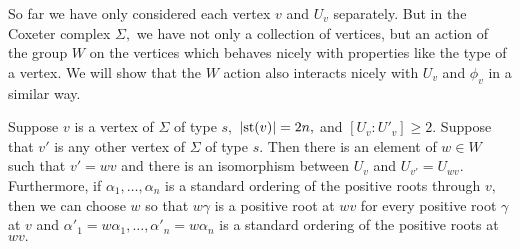 \documentclass[class=book, crop=false,12 pt]{standalone}
\begin{document}
So far we have only considered each vertex $v$ and $U_v$ separately. But in the Coxeter complex $\Sigma,$ we have not only a collection of vertices, but an action of the group $W$ on the vertices which behaves nicely with properties like the type of a vertex. We will show that the $W$ action also interacts nicely with $U_v$ and $\phi_v$ in a similar way.

\begin{lemma}
	\label{lem:resporder}
	Suppose $v$ is a vertex of $\Sigma$ of type $s,$ $|\mathrm{st}(v)|=2n,$ and $[U_v:U'_v]\ge 2.$ Suppose that $v'$ is any other vertex of $\Sigma$ of type $s.$ Then there is an element of $w\in W$ such that $v'=wv$ and there is an isomorphism between $U_v$ and $U_{v'}=U_{wv}.$ Furthermore, if $\alpha_1,\dots,\alpha_n$ is a standard ordering of the positive roots through $v,$ then we can choose $w$ so that $w\gamma$ is a positive root at $wv$ for every positive root $\gamma$ at $v$ and $\alpha'_1=w\alpha_1,\dots,\alpha'_n=w\alpha_n$ is a standard ordering of the positive roots at $wv.$
\end{lemma}
\end{document}
